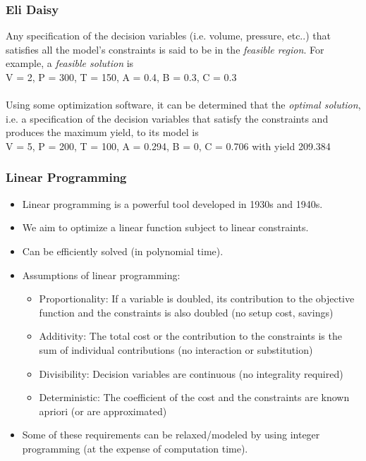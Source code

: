 \documentclass[11pt]{beamer}
\begin{document}
\begin{frame}
\frametitle{Eli Daisy}
Any specification of the decision variables (i.e. volume, pressure, etc..) that satisfies all the model’s constraints is said to be in the \textit{feasible region}.  
For example, a \textit{feasible solution} is \\
V = 2, P = 300, T = 150, A = 0.4,  B = 0.3, C = 0.3\\
\mbox{ } \\

Using some optimization software, it can be determined that the \textit{optimal solution}, i.e. a specification of the decision variables that satisfy the constraints and produces the maximum yield,  to its model is
\\V = 5, P = 200, T = 100, A = 0.294, B = 0, C = 0.706 with yield 209.384

\end{frame}

\begin{frame}
\frametitle{Linear Programming}
\begin{itemize}[<+->]
\item Linear programming is a powerful tool developed in 1930s and 1940s.
\item We aim to optimize a linear function subject to linear constraints.
\item Can be efficiently solved (in polynomial time).
\item Assumptions of linear programming:
\begin{itemize}
\item Proportionality: If a variable is doubled, its contribution to the objective function and the constraints is also doubled (no setup cost, savings)
\item Additivity: The total cost or the contribution to the constraints is the sum of individual contributions (no interaction or substitution)
\item Divisibility: Decision variables are continuous (no integrality required)
\item Deterministic: The coefficient of the cost and the constraints are known apriori (or are approximated)
\end{itemize}
\item Some of these requirements can be relaxed/modeled by using integer programming (at the expense of computation time).
\end{itemize}

\end{frame}
\end{document}
